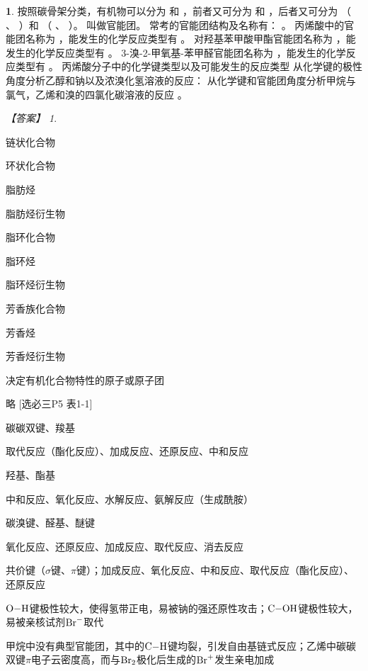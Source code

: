 \documentclass[UTF8, 10pt, a4paper, oneside]{ctexart}
\newcommand{\blank}{ \underbar{\quad$\blacktriangle$\quad} }%
\newcommand{\fs}[1]{{\fangsong #1}}%
\theoremstyle{definition}
\newtheorem{exercise}{}
\theoremstyle{remark}
\newtheorem*{answer}{【答案】}
\theoremstyle{plain}
\begin{document}
\begin{exercise}
    按照碳骨架分类，有机物可以分为\blank 和\blank ，前者又可分为\blank 和\blank
    ，后者又可分为\blank （\blank 、\blank ）和\blank （\blank 、\blank ）。
    \blank 叫做官能团。
    常考的官能团结构及名称有：\blank 。
    丙烯酸中的官能团名称为\blank ，能发生的化学反应类型有\blank 。
    对羟基苯甲酸甲酯官能团名称为\blank ，能发生的化学反应类型有\blank 。
    3-溴-2-甲氧基-苯甲醛官能团名称为\blank ，能发生的化学反应类型有\blank 。
    丙烯酸分子中的化学键类型以及可能发生的反应类型\blank
    从化学键的极性角度分析乙醇和钠以及浓溴化氢溶液的反应：\blank
    从化学键和官能团角度分析甲烷与氯气，乙烯和溴的四氯化碳溶液的反应\blank。
    \begin{answer}
        \begin{inparaenum}
            \item[\setcounter{enumi}{1}\textsuperscript{\arabic{enumi}}] 链状化合物
            \item 环状化合物
            \item 脂肪烃
            \item 脂肪烃衍生物
            \item 脂环化合物
            \item 脂环烃
            \item 脂环烃衍生物
            \item 芳香族化合物
            \item 芳香烃
            \item 芳香烃衍生物
            \item 决定有机化合物特性的原子或原子团
            \item \fs{略 [选必三P5 表1-1]}
            \item 碳碳双键、羧基
            \item 取代反应（酯化反应）、加成反应、还原反应、中和反应
            \item 羟基、酯基
            \item 中和反应、氧化反应、水解反应、氨解反应（生成酰胺）
            \item 碳溴键、醛基、醚键
            \item 氧化反应、还原反应、加成反应、取代反应、消去反应
            \item 共价键（$\sigma$键、$\pi$键）；加成反应、氧化反应、中和反应、取代反应（酯化反应）、还原反应
            \item $\ce{O-H}$键极性较大，使得氢带正电，易被钠的强还原性攻击；$\ce{C-OH}$键极性较大，易被亲核试剂$\ce{Br-}$取代
            \item 甲烷中没有典型官能团，其中的$\ce{C-H}$键均裂，引发自由基链式反应；乙烯中碳碳双键$\pi$电子云密度高，而与$\ce{Br2}$极化后生成的$\ce{Br+}$发生亲电加成
        \end{inparaenum}
    \end{answer}
\end{exercise}
\end{document}

